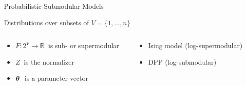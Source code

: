 \documentclass[mathserif]{beamer}
\newcommand{\btheta}{\*\theta}
\begin{document}
\begin{frame}{Probabilistic Submodular Models}

\begin{center}
Distributions over subsets of $V = \{1,\ldots,n\}$

\vspace{0.8em}
\qboxa{
$p(S; \btheta) = \displaystyle\frac{1}{Z(\btheta)}\exp \big( F(S; \btheta) \big)$
}
\end{center}
\vspace{2em}

\begin{columns}
\begin{column}{0.54\textwidth}
\begin{itemize}
\item $F : 2^V \to \mathbb{R}\ $ is sub- or supermodular
\item $Z\ $ is the normalizer
\item $\btheta\ $ is a parameter vector
\end{itemize}
\end{column}
\begin{column}{0.39\textwidth}
\begin{itemize}
\item Ising model (log-supermodular)
\item DPP (log-submodular)
\end{itemize}
\end{column}
\end{columns}

\end{frame}
\end{document}
